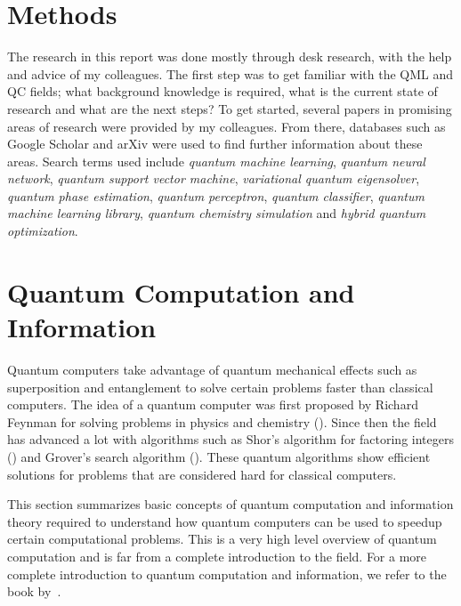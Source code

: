 \documentclass[a4paper,10pt]{article}
\begin{document}
\section{Methods} \label{sec:methods}
The research in this report was done mostly through desk research, with the help and advice of my colleagues.
The first step was to get familiar with the QML and QC fields; what background knowledge is required, what is the current state of research and what are the next steps?
To get started, several papers in promising areas of research were provided by my colleagues. 
From there, databases such as Google Scholar and arXiv were used to find further information about these areas.
Search terms used include \emph{quantum machine learning}, \emph{quantum neural network}, \emph{quantum support vector machine}, \emph{variational quantum eigensolver}, \emph{quantum phase estimation}, \emph{quantum perceptron}, \emph{quantum classifier}, \emph{quantum machine learning library}, \emph{quantum chemistry simulation} and \emph{hybrid quantum optimization}.

\section{Quantum Computation and Information} \label{sec:quantum-computation-information}
Quantum computers take advantage of quantum mechanical effects such as superposition and entanglement to solve certain problems faster than classical computers.
The idea of a quantum computer was first proposed by Richard Feynman for solving problems in physics and chemistry (\cite{feynman-simulating}).
Since then the field has advanced a lot with algorithms such as Shor's algorithm for factoring integers (\cite{shor-factoring}) and Grover's search algorithm (\cite{grover-search}).
These quantum algorithms show efficient solutions for problems that are considered hard for classical computers.

This section summarizes basic concepts of quantum computation and information theory required to understand how quantum computers can be used to speedup certain computational problems.
This is a very high level overview of quantum computation and is far from a complete introduction to the field.
For a more complete introduction to quantum computation and information, we refer to the book by~\cite{nielsen-chuang}.
\end{document}
